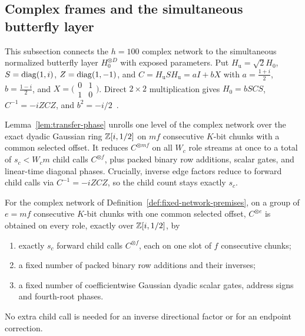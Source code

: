 \subsection{Complex frames and the simultaneous butterfly layer}\label{sec:transfer-frames}

This subsection connects the $h=100$ complex network to the simultaneous normalized butterfly layer $H_0^{\otimes D}$ with exposed parameters. Put $H_{\mathrm u}=\sqrt2H_0$, $S=\operatorname{diag}(1,i)$, $Z=\operatorname{diag}(1,-1)$, and $C=H_{\mathrm u}SH_{\mathrm u}=aI+bX$ with $a=\frac{1+i}2$, $b=\frac{1-i}2$, and $X=\bigl(\begin{smallmatrix}0&1\\1&0\end{smallmatrix}\bigr)$. Direct $2\times2$ multiplication gives $H_0=bSCS$, $C^{-1}=-iZCZ$, and $b^2=-i/2$~\cite[\S5.1, (13)--(14) and \S5.4, p.~36]{OAI26}.

Lemma~\ref{lem:transfer-phase} unrolls one level of the complex network over the exact dyadic Gaussian ring $\mathbb{Z}[i,1/2]$ on $mf$ consecutive $K$-bit chunks with a common selected offset. It reduces $C^{\otimes mf}$ on all $W_c$ role streams at once to a total of $s_c<W_c m$ child calls $C^{\otimes f}$, plus packed binary row additions, scalar gates, and linear-time diagonal phases. Crucially, inverse edge factors reduce to forward child calls via $C^{-1}=-iZCZ$, so the child count stays exactly $s_c$.

\begin{lemma}\label{lem:transfer-phase}
For the complex network of Definition~\ref{def:fixed-network-premises}, on a group of $e=mf$ consecutive $K$-bit chunks
with one common selected offset, $C^{\otimes e}$ is obtained on every role, exactly over $\mathbb{Z}[i,1/2]$, by
\begin{enumerate}[label=(\arabic*),leftmargin=*]
\item exactly $s_c$ forward child calls $C^{\otimes f}$, each on one slot of $f$ consecutive chunks;
\item a fixed number of packed binary row additions and their inverses;
\item a fixed number of coefficientwise Gaussian dyadic scalar gates, address signs and fourth-root phases.
\end{enumerate}
No extra child call is needed for an inverse directional factor or for an endpoint correction.
\end{lemma}

